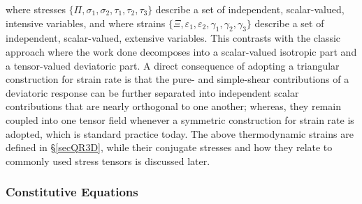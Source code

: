 where stresses $\{ \Pi , \sigma_1 , \sigma_2 , \tau_1 , \tau_2 , \tau_3  \}$ describe a set of independent, scalar-valued, intensive variables, and where strains $\{ \Xi , \varepsilon_1 , \varepsilon_2 , \gamma_1 , \gamma_2 , \gamma_3 \}$ describe a set of independent, scalar-valued, extensive variables.  This contrasts with the classic approach where the work done decomposes into a scalar-valued isotropic part and a tensor-valued deviatoric part.  A direct consequence of adopting a triangular construction for strain rate is that the pure- and simple-shear contributions of a deviatoric response can be further separated into independent scalar contributions that are nearly orthogonal to one another; whereas, they remain coupled into one tensor field whenever a symmetric construction for strain rate is adopted, which is standard practice today.  The above thermo\-dynamic strains are defined in \S\ref{secQR3D}, while their conjugate stresses and how they relate to commonly used stress tensors is discussed later. 

\subsubsection{Constitutive Equations}

